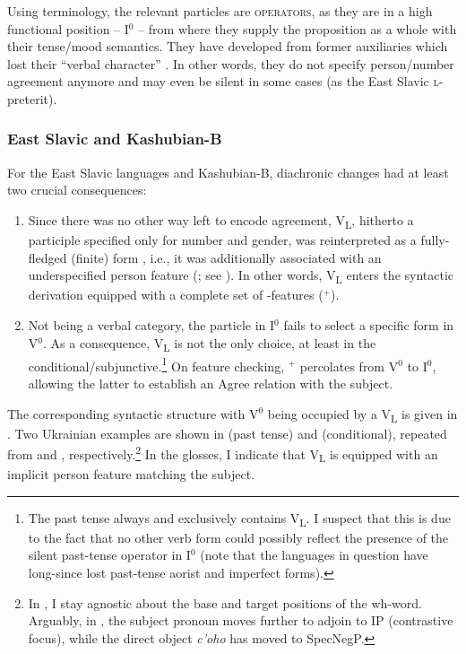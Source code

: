 \documentclass[output=paper]{langscibook}
\begin{document}
Using  terminology, the relevant particles are \textsc{operators}, as they are in a high functional position -- I$^0$ -- from where they supply the proposition as a whole with their tense/mood semantics. They have developed from former auxiliaries which lost their ``verbal character'' \citep{Issatchenko1940}. In other words, they do not specify person/number agreement anymore and may even be silent in some cases (as the East Slavic \textsc{l-}preterit).


    \largerpage[-1]

\subsubsection{East Slavic and Kashubian-B}

For the East Slavic languages and Kashubian-B, diachronic changes had at least two crucial consequences: 

\begin{enumerate}
\item Since there was no other way left to encode agreement, V\textsubscript{L}, hitherto a participle specified only for number and gender, was reinterpreted as a fully-fledged (finite) form \citep[see][757]{Tseng2009}, i.e., it was additionally associated with an underspecified person feature (\citealt[174]{Junghanns1995}; see ). In other words, V\textsubscript{L} enters the syntactic derivation equipped with a complete set of \textphi-features (\textphi$^+$).
\item Not being a verbal category, the particle in I$^0$ fails to select a specific form in V$^0$. As a consequence, V\textsubscript{L} is not the only choice, at least in the conditional/\hspace{0pt}subjunctive.\footnote{The past tense always and exclusively contains V\textsubscript{L}. I suspect that this is due to the fact that no other verb form could possibly reflect the presence of the silent past-tense operator in I$^0$ (note that the languages in question have long-since lost past-tense aorist and imperfect forms).} On feature checking, \textphi$^+$ percolates from V$^0$ to I$^0$, allowing the latter to establish an Agree relation with the subject.
\end{enumerate}

The corresponding syntactic structure with V$^0$ being occupied by a V\textsubscript{L} is given in . Two Ukrainian examples are shown in  (past tense) and  (conditional), repeated from  and , respectively.\footnote{In , I stay agnostic about the base and target positions of the wh-word. Arguably, in , the subject pronoun moves further to adjoin to IP (contrastive focus), while the direct object \textit{c'oho} has moved to SpecNegP.} In the glosses, I indicate that V\textsubscript{L} is equipped with an implicit person feature matching the subject.
\end{document}
